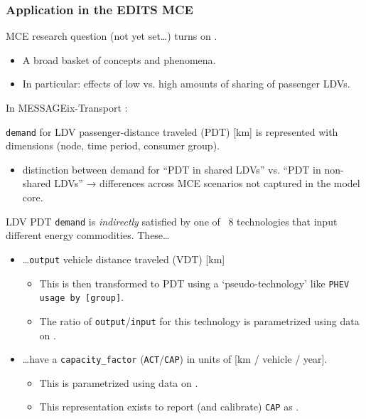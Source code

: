 \documentclass[12pt,aspectratio=169]{beamer}
\begin{document}
\begin{frame}[allowframebreaks]
\frametitle{Application in the EDITS MCE}

MCE research question (not yet set…) turns on .
\begin{itemize}
  \item A broad basket of concepts and phenomena.
  \item In particular: effects of low vs. high amounts of sharing of passenger LDVs.
\end{itemize}

\bigskip
In MESSAGEix-Transport :

\smallskip
\texttt{demand} for LDV passenger-distance traveled (PDT) [km] is represented with dimensions (node, time period, consumer group).
\begin{itemize}
  \item {} distinction between demand for “PDT in shared LDVs” vs. “PDT in non-shared LDVs” → differences across MCE scenarios not captured in the model core.
\end{itemize}

\framebreak
LDV PDT \texttt{demand} is \emph{indirectly} satisfied by one of ~8 technologies that input different energy commodities.
These…
\begin{itemize}
  \item …\texttt{output} vehicle distance traveled (VDT) [km]
  \begin{itemize}
    \item This is then transformed to PDT using a ‘pseudo-technology’ like \texttt{PHEV usage by [group]}.
    \item The ratio of \texttt{output}/\texttt{input} for this technology is parametrized using data on .
  \end{itemize}
  \item …have a \texttt{capacity\_factor} (\texttt{ACT}/\texttt{CAP}) in units of [km / vehicle / year].
  \begin{itemize}
    \item This is parametrized using data on .
    \item This representation exists to report (and calibrate) \texttt{CAP} as .
  \end{itemize}
\end{itemize}
\end{frame}
\end{document}
